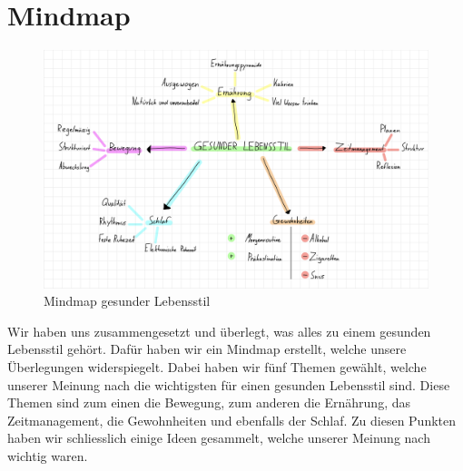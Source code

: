 \chapter{Mindmap}
\authortoc{\bastian}{\chapterident}
\begin{figure}[!ht]
  \centering
  \includegraphics[width=.9\linewidth]{./images/mindmap.png}
  \caption[Ein von uns digital erstelltes Mindmap]{Mindmap gesunder Lebensstil}
  \label{fig:mindmap}
\end{figure}
Wir haben uns zusammengesetzt und überlegt, was alles zu einem gesunden Lebensstil gehört. Dafür haben wir ein Mindmap erstellt, welche unsere Überlegungen widerspiegelt. Dabei haben wir fünf Themen gewählt, welche unserer Meinung nach die wichtigsten für einen gesunden Lebensstil sind. Diese Themen sind zum einen die Bewegung, zum anderen die Ernährung, das Zeitmanagement, die Gewohnheiten und ebenfalls der Schlaf. Zu diesen Punkten haben wir schliesslich einige Ideen gesammelt, welche unserer Meinung nach wichtig waren.
